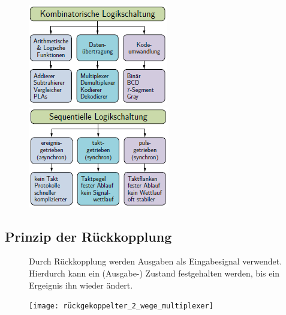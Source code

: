 \documentclass[12pt]{report}
\begin{document}
\begin{figure}[H]
  \begin{minipage}[t]{0.45\textwidth}
    \includegraphics[width=\textwidth]{../graphics/kombinatorische_logikschaltung}
  \end{minipage}
  \hfill
  \begin{minipage}[t]{0.45\textwidth}
    \includegraphics[width=\textwidth]{../graphics/sequentielle_logikschaltung}
  \end{minipage}
\end{figure}

\subsection{Prinzip der Rückkopplung}
\begin{defbox}[Rückkopplung]
  \begin{figure}[H]
    \begin{minipage}[t]{0.7\textwidth}
      Durch Rückkopplung werden Ausgaben als Eingabesignal verwendet. 
      Hierdurch kann ein (Ausgabe-) Zustand festgehalten werden, 
      bis ein Ergeignis ihn wieder ändert.
    \end{minipage}
    \hfill
    \begin{minipage}[t]{0.25\textwidth}
      \texttt{[image: rückgekoppelter\_2\_wege\_multiplexer]}
    \end{minipage}
  \end{figure}
\end{defbox}
\end{document}
